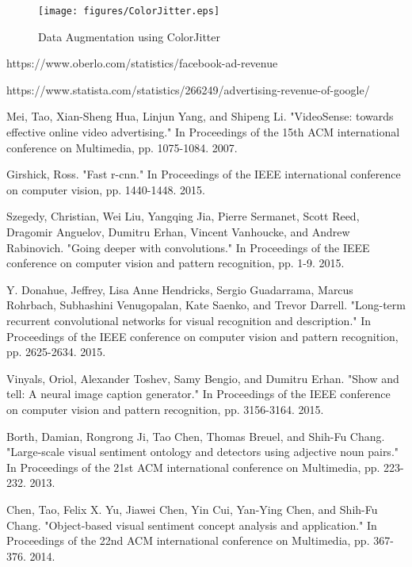 \documentclass[conference]{IEEEtran}
\begin{document}
\begin{figure}[htbp] 
    \texttt{[image: figures/ColorJitter.eps]} 
    \caption{Data Augmentation using ColorJitter} 
    \label{fig} 
    \end{figure}

\begin{thebibliography}{00}
 https://www.oberlo.com/statistics/facebook-ad-revenue

 https://www.statista.com/statistics/266249/advertising-revenue-of-google/

 Mei, Tao, Xian-Sheng Hua, Linjun Yang, and Shipeng Li. "VideoSense: towards effective online video advertising." In Proceedings of the 15th ACM international conference on Multimedia, pp. 1075-1084. 2007.

 Girshick, Ross. "Fast r-cnn." In Proceedings of the IEEE international conference on computer vision, pp. 1440-1448. 2015.

 Szegedy, Christian, Wei Liu, Yangqing Jia, Pierre Sermanet, Scott Reed, Dragomir Anguelov, Dumitru Erhan, Vincent Vanhoucke, and Andrew Rabinovich. "Going deeper with convolutions." In Proceedings of the IEEE conference on computer vision and pattern recognition, pp. 1-9. 2015.

 Y. Donahue, Jeffrey, Lisa Anne Hendricks, Sergio Guadarrama, Marcus Rohrbach, Subhashini Venugopalan, Kate Saenko, and Trevor Darrell. "Long-term recurrent convolutional networks for visual recognition and description." In Proceedings of the IEEE conference on computer vision and pattern recognition, pp. 2625-2634. 2015.

 Vinyals, Oriol, Alexander Toshev, Samy Bengio, and Dumitru Erhan. "Show and tell: A neural image caption generator." In Proceedings of the IEEE conference on computer vision and pattern recognition, pp. 3156-3164. 2015.

 Borth, Damian, Rongrong Ji, Tao Chen, Thomas Breuel, and Shih-Fu Chang. "Large-scale visual sentiment ontology and detectors using adjective noun pairs." In Proceedings of the 21st ACM international conference on Multimedia, pp. 223-232. 2013.

 Chen, Tao, Felix X. Yu, Jiawei Chen, Yin Cui, Yan-Ying Chen, and Shih-Fu Chang. "Object-based visual sentiment concept analysis and application." In Proceedings of the 22nd ACM international conference on Multimedia, pp. 367-376. 2014.


\end{thebibliography}
\end{document}
